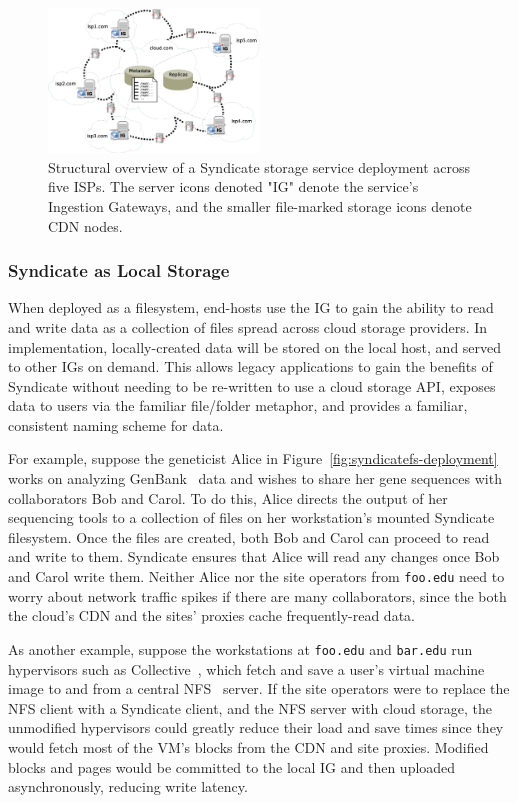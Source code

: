 \begin{figure}[h!]
\centering
\includegraphics[width=0.5\textwidth]{figures/syndicate-httpd-deployment}
\caption{Structural overview of a Syndicate storage service deployment across five ISPs.  The server icons denoted "IG" denote the service's Ingestion Gateways, and the smaller file-marked storage icons denote CDN nodes.}
\label{fig:syndicate-httpd-deployment}
\end{figure}

\subsubsection{Syndicate as Local Storage}

When deployed as a filesystem, end-hosts use the IG to gain the ability to read and write data as a collection of files spread across cloud storage providers.  In implementation, locally-created data will be stored on the local host, and served to other IGs on demand.  This allows legacy applications to gain the benefits of Syndicate without needing to be re-written to use a cloud storage API, exposes data to users via the familiar file/folder metaphor, and provides a familiar, consistent naming scheme for data.

For example, suppose the geneticist Alice in Figure~\ref{fig:syndicatefs-deployment} works on analyzing GenBank~\cite{GenBank} data and wishes to share her gene sequences with collaborators Bob and Carol.  To do this, Alice directs the output of her sequencing tools to a collection of files on her workstation's mounted Syndicate filesystem.  Once the files are created, both Bob and Carol can proceed to read and write to them.  Syndicate ensures that Alice will read any changes once Bob and Carol write them.  Neither Alice nor the site operators from \texttt{foo.edu} need to worry about network traffic spikes if there are many collaborators, since the both the cloud's CDN and the sites' proxies cache frequently-read data.

As another example, suppose the workstations at \texttt{foo.edu} and \texttt{bar.edu} run hypervisors such as Collective~\cite{Collective}, which fetch and save a user's virtual machine image to and from a central NFS~\cite{NFS} server.  If the site operators were to replace the NFS client with a Syndicate client, and the NFS server with cloud storage, the unmodified hypervisors could greatly reduce their load and save times since they would fetch most of the VM's blocks from the CDN and site proxies.  Modified blocks and pages would be committed to the local IG and then uploaded asynchronously, reducing write latency.

